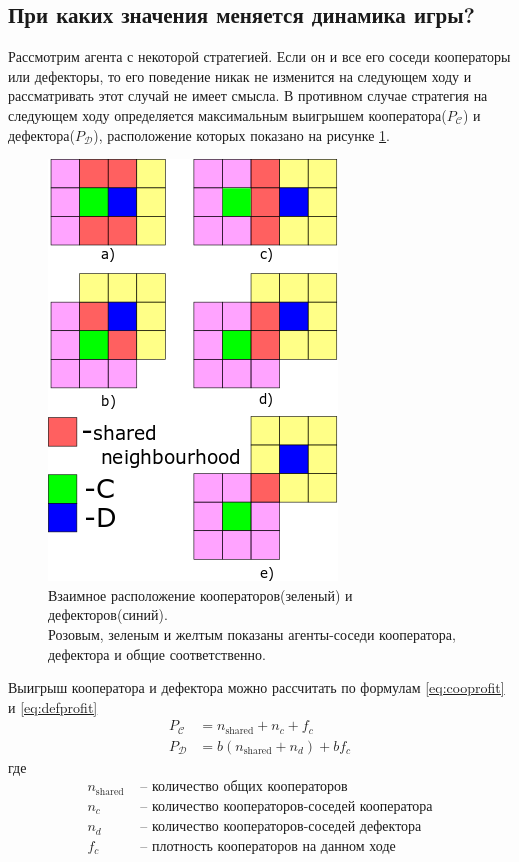 \documentclass[12pt]{article}
\begin{document}
\subsection{При каких значения меняется динамика игры?}
    Рассмотрим агента с некоторой стратегией. Если он и все его соседи кооператоры или дефекторы, то его поведение никак не изменится на следующем ходу и рассматривать этот случай не имеет смысла. В противном случае стратегия на следующем ходу определяется максимальным выигрышем кооператора($P_{\mathcal{C}}$) и дефектора($P_{\mathcal{D}}$), расположение которых показано на рисунке \ref{fig:neigh}.
    \begin{figure}[h!]
        \centering
        \captionsetup{justification=centering}
        \includegraphics[scale=.5]{neighbourhoods.png}
        \caption{\small Взаимное расположение кооператоров(зеленый) и дефекторов(синий).\\
        Розовым, зеленым и желтым показаны агенты-соседи кооператора, дефектора и общие соответственно.}
        \label{fig:neigh}
    \end{figure}

    Выигрыш кооператора и дефектора можно рассчитать по формулам \eqref{eq:cooprofit} и \eqref{eq:defprofit}
    \begin{align}
        P_{\mathcal{C}}& = n_\mathrm{shared} + n_c + f_c\label{eq:cooprofit}\\
        P_{\mathcal{D}}& = b(n_\mathrm{shared} + n_d) + bf_c\label{eq:defprofit}
    \end{align}
    где
    \begin{align*}
        n_\mathrm{shared}&\text{ -- количество общих кооператоров}\\
        n_c&\text{ -- количество кооператоров-соседей кооператора}\\
        n_d&\text{ -- количество кооператоров-соседей дефектора}\\ f_c&\text{ -- плотность кооператоров на данном ходе}
    \end{align*}
\end{document}
